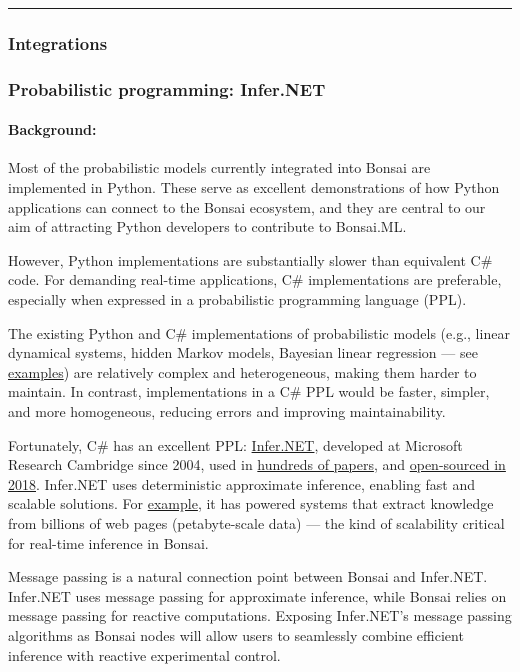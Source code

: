 \noindent\rule{\textwidth}{1pt}
\subsubsection*{Integrations}

\subsubsection*{Probabilistic programming: Infer.NET}

\paragraph{Background:} Most of the probabilistic models currently integrated
into Bonsai are implemented in Python. These serve as excellent demonstrations
of how Python applications can connect to the Bonsai ecosystem, and they are
central to our aim of attracting Python developers to contribute to Bonsai.ML.

However, Python implementations are substantially slower than equivalent C\#
code. For demanding real-time applications, C\# implementations are preferable,
especially when expressed in a probabilistic programming language (PPL).

The existing Python and C\# implementations of probabilistic models (e.g.,
linear dynamical systems, hidden Markov models, Bayesian linear regression —
see
\href{https://bonsai-rx.org/machinelearning/examples/README.html}{examples})
are relatively complex and heterogeneous, making them harder to maintain. In
contrast, implementations in a C\# PPL would be faster, simpler, and more
homogeneous, reducing errors and improving maintainability.

Fortunately, C\# has an excellent PPL:
\href{https://dotnet.github.io/infer/}{Infer.NET}, developed at Microsoft
Research Cambridge since 2004, used in
\href{https://dotnet.github.io/infer/papers.html}{hundreds of papers}, and
\href{https://www.microsoft.com/en-us/research/blog/the-microsoft-infer-net-machine-learning-framework-goes-open-source/}{open-sourced
in 2018}.  Infer.NET uses deterministic approximate inference, enabling fast
and scalable solutions. For
\href{https://www.microsoft.com/en-us/research/blog/the-microsoft-infer-net-machine-learning-framework-goes-open-source/}{example},
it has powered systems that extract knowledge from billions of web pages
(petabyte-scale data) — the kind of scalability critical for real-time
inference in Bonsai.

Message passing is a natural connection point between Bonsai and Infer.NET.
Infer.NET uses message passing for approximate inference, while Bonsai relies
on message passing for reactive computations. Exposing Infer.NET’s message
passing algorithms as Bonsai nodes will allow users to seamlessly combine
efficient inference with reactive experimental control.

